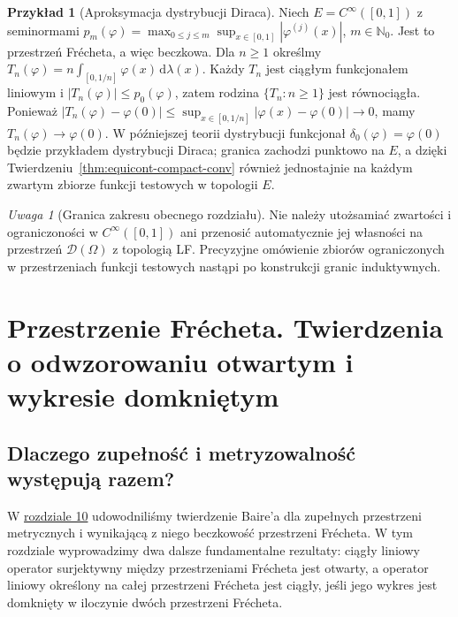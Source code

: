 \documentclass[11pt,a4paper]{article}
\numberwithin{equation}{section}
\theoremstyle{plain}
\theoremstyle{definition}
\newtheorem{przyklad}[twierdzenie]{Przykład}
\theoremstyle{remark}
\newtheorem{uwaga}[twierdzenie]{Uwaga}
\newcommand{\N}{\mathbb N}
\begin{document}
\begin{przyklad}[Aproksymacja dystrybucji Diraca]\label{ex:delta-approx-barrel}
Niech $E=C^\infty([0,1])$ z seminormami
$p_m(\varphi)=\max_{0\le j\le m}\sup_{x\in[0,1]}|\varphi^{(j)}(x)|$,
$m\in\N_0$. Jest to przestrzeń Frécheta, a więc beczkowa.
Dla $n\ge1$ określmy
$T_n(\varphi)=n\int_{[0,1/n]}\varphi(x)\,\mathrm d\lambda(x)$.
Każdy $T_n$ jest ciągłym funkcjonałem liniowym i
$|T_n(\varphi)|\le p_0(\varphi)$, zatem rodzina
$\{T_n:n\ge1\}$ jest równociągła. Ponieważ
$|T_n(\varphi)-\varphi(0)|\le
\sup_{x\in[0,1/n]}|\varphi(x)-\varphi(0)|\to0$,
mamy $T_n(\varphi)\to\varphi(0)$. W późniejszej teorii
dystrybucji funkcjonał $\delta_0(\varphi)=\varphi(0)$
będzie przykładem dystrybucji Diraca; granica zachodzi
punktowo na $E$, a dzięki
Twierdzeniu~\ref{thm:equicont-compact-conv} również
jednostajnie na każdym zwartym zbiorze funkcji testowych
w topologii $E$.
\end{przyklad}

\begin{uwaga}[Granica zakresu obecnego rozdziału]
Nie należy utożsamiać zwartości i ograniczoności w
$C^\infty([0,1])$ ani przenosić automatycznie jej własności
na przestrzeń $\mathcal D(\Omega)$ z topologią LF.
Precyzyjne omówienie zbiorów ograniczonych w przestrzeniach
funkcji testowych nastąpi po konstrukcji granic induktywnych.
\end{uwaga}


\setcounter{section}{10}
\section{Przestrzenie Frécheta. Twierdzenia o odwzorowaniu otwartym i wykresie domkniętym}\label{sec:frechet-open-graph}

\subsection{Dlaczego zupełność i metryzowalność występują razem?}

W \hyperref[sec:beczkowe-bornologiczne]{rozdziale 10} udowodniliśmy twierdzenie
Baire'a dla zupełnych przestrzeni metrycznych i wynikającą z niego
beczkowość przestrzeni Frécheta. W tym rozdziale wyprowadzimy dwa dalsze
fundamentalne rezultaty: ciągły liniowy operator surjektywny między
przestrzeniami Frécheta jest otwarty, a operator liniowy określony na
całej przestrzeni Frécheta jest ciągły, jeśli jego wykres jest domknięty
w iloczynie dwóch przestrzeni Frécheta.
\end{document}
